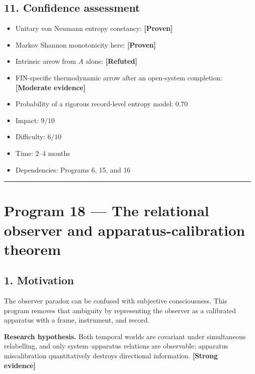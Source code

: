 \documentclass[11pt,a4paper,openany]{report}
\newcommand{\statusProven}{\textcolor{fingreen}{[Proven]}}
\newcommand{\statusStrong}{\textcolor{finblue}{[Strong evidence]}}
\newcommand{\statusModerate}{\textcolor{finviolet}{[Moderate evidence]}}
\newcommand{\statusRefuted}{\textcolor{finred}{[Refuted]}}
\begin{document}
\section{11. Confidence assessment}

\begin{itemize}
\item 
Unitary von Neumann entropy constancy: \textbf{\statusProven{}}

\item 
Markov Shannon monotonicity here: \textbf{\statusProven{}}

\item 
Intrinsic arrow from \(A\) alone: \textbf{\statusRefuted{}}

\item 
FIN-specific thermodynamic arrow after an open-system completion: \textbf{\statusModerate{}}

\item 
Probability of a rigorous record-level entropy model: \(0.70\)

\item 
Impact: \(9/10\)

\item 
Difficulty: \(6/10\)

\item 
Time: 2–4 months

\item 
Dependencies: Programs 6, 15, and 16

\end{itemize}

\par\medskip\hrule\medskip

\chapter{Program 18 — The relational observer and apparatus-calibration theorem}

\section{1. Motivation}

The observer paradox can be confused with subjective consciousness. This program removes that ambiguity by representing the observer as a calibrated apparatus with a frame, instrument, and record.

\textbf{Research hypothesis.} Both temporal worlds are covariant under simultaneous relabelling, and only system–apparatus relations are observable; apparatus miscalibration quantitatively destroys directional information. \textbf{\statusStrong{}}
\end{document}
